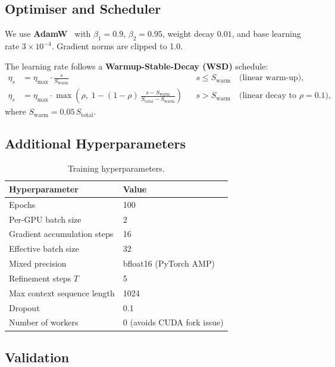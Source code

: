 \documentclass[11pt,a4paper]{article}
\begin{document}
\subsection{Optimiser and Scheduler}

We use \textbf{AdamW}~\cite{loshchilov2018decoupled} with $\beta_1{=}0.9$,
$\beta_2{=}0.95$, weight decay $0.01$, and base learning rate $3 \times 10^{-4}$.
Gradient norms are clipped to 1.0.

The learning rate follows a \textbf{Warmup-Stable-Decay (WSD)} schedule:
\begin{align}
  \eta_s &= \eta_{\max} \cdot \frac{s}{S_{\text{warm}}}
  && s \leq S_{\text{warm}} \quad\text{(linear warm-up)}, \\[4pt]
  \eta_s &= \eta_{\max} \cdot \max\!\left(\rho,\; 1 - (1{-}\rho)\,
             \frac{s - S_{\text{warm}}}{S_{\text{total}} - S_{\text{warm}}}\right)
  && s > S_{\text{warm}} \quad\text{(linear decay to }\rho{=}0.1\text{)},
\end{align}
where $S_{\text{warm}} = 0.05\,S_{\text{total}}$.

\subsection{Additional Hyperparameters}

\begin{table}[H]
\centering
\caption{Training hyperparameters.}
\label{tab:hparams}
\begin{tabular}{ll}
\toprule
Hyperparameter & Value \\
\midrule
Epochs & 100 \\
Per-GPU batch size & 2 \\
Gradient accumulation steps & 16 \\
Effective batch size & 32 \\
Mixed precision & bfloat16 (PyTorch AMP) \\
Refinement steps $T$ & 5 \\
Max context sequence length & 1024 \\
Dropout & 0.1 \\
Number of workers & 0 (avoids CUDA fork issue) \\
\bottomrule
\end{tabular}
\end{table}

\subsection{Validation}
\end{document}

